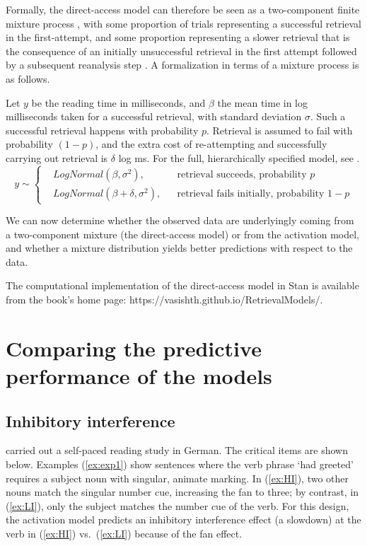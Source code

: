 \documentclass{cambridge7A}\usepackage[]{graphicx}\usepackage[]{color}
\begin{document}
Formally, the direct-access model can therefore be seen as a two-component finite mixture process \citep{mclachlan2004finite,fruhwirth2006finite}, with some proportion of trials representing a successful retrieval in the first-attempt, and some proportion representing a slower retrieval that is the consequence of an initially unsuccessful retrieval in the first attempt followed by a subsequent reanalysis step \citep{NicenboimRetrieval2018}. A formalization in terms of a mixture process is as follows.

Let $y$ be the reading time in milliseconds, and $\beta$ the mean time in log milliseconds taken for a successful retrieval, with standard deviation $\sigma$. Such a successful retrieval happens with probability $p$. Retrieval is assumed to fail with probability $(1-p)$, and the extra cost of re-attempting and successfully carrying out retrieval is $\delta$ log ms. For the full, hierarchically specified model, see \cite{NicenboimRetrieval2018}.
\begin{equation} \label{eq:mixmodsr2}
  y \sim \left \{
  \begin{aligned}
    &LogNormal(\beta,\sigma^2), && \text{retrieval succeeds, probability $p$} \\
    & LogNormal(\beta+\delta,\sigma^2), && \text{retrieval fails initially, probability $1-p$} 
  \end{aligned} \right.
\end{equation} 

We can now determine whether the observed data are underlyingly coming from a two-component mixture (the direct-access model) or from the activation model, and whether a mixture distribution yields better predictions with respect to the data.  

The \cite{NicenboimRetrieval2018} computational implementation of the direct-access model in Stan \citep{stan:2017} is available from the book's home page: https://vasishth.github.io/RetrievalModels/.

\section{Comparing the predictive performance of the models}\label{nicenboiminhint}

\subsection{Inhibitory interference}

\cite{nicenboimexploratory} carried out a self-paced reading study in German. The critical items are shown below. Examples (\ref{ex:exp1}) show  sentences where the verb phrase `had greeted' requires a subject noun with singular, animate marking. In (\ref{ex:HI}), two other nouns match the  singular number cue, increasing the fan to three; by contrast, in (\ref{ex:LI}), only the subject matches the number cue of the verb.  For this design, the  activation model predicts an  inhibitory interference effect (a slowdown) at the verb in (\ref{ex:HI}) vs.\ (\ref{ex:LI}) because of the  fan effect.    
\end{document}
